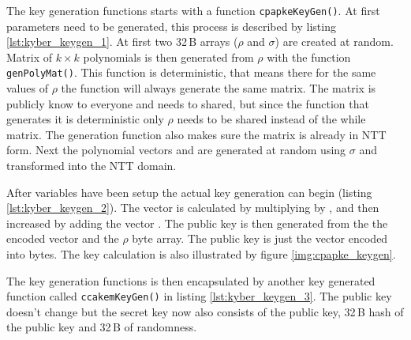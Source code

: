 The key generation functions starts with a function \texttt{cpapkeKeyGen()}. At first parameters need to be generated, this process is described by listing \ref{lst:kyber_keygen_1}. At first two 32\,B arrays ($\rho$ and $\sigma$) are created at random. Matrix  of $k\times k$ polynomials is then generated from $\rho$ with the function \texttt{genPolyMat()}. This function is deterministic, that means there for the same values of $\rho$ the function will always generate the same matrix. The matrix  is publicly know to everyone and needs to shared, but since the function that generates it is deterministic only $\rho$ needs to be shared instead of the while matrix. The generation function also makes sure the matrix is already in NTT form. Next the polynomial vectors  and  are generated at random using $\sigma$ and transformed into the NTT domain.

After variables have been setup the actual key generation can begin (listing \ref{lst:kyber_keygen_2}). The vector  is calculated by multiplying  by , and then increased by adding the vector . The public key is then generated from the the encoded vector  and the $\rho$ byte array. The public key is just the vector  encoded into bytes. The key calculation is also illustrated by figure \ref{img:cpapke_keygen}.
\newpage
{}

The key generation functions is then encapsulated by another key generated function called \texttt{ccakemKeyGen()} in listing \ref{lst:kyber_keygen_3}. The public key doesn't change but the secret key now also consists of the public key, 32\,B hash of the public key and 32\,B of randomness.

